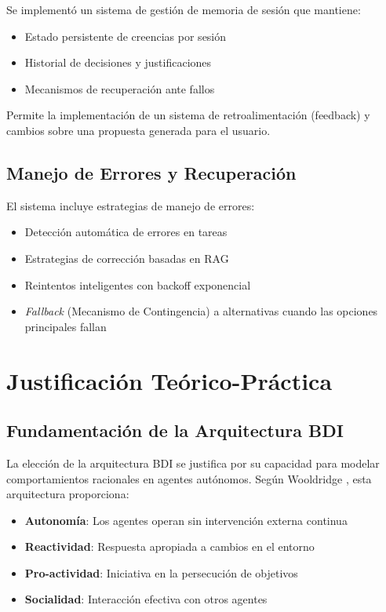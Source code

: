 \documentclass[runningheads,a4paper]{llncs}
\begin{document}
Se implementó un sistema de gestión de memoria de sesión que mantiene:

\begin{itemize}
    \item Estado persistente de creencias por sesión
    \item Historial de decisiones y justificaciones
    \item Mecanismos de recuperación ante fallos
\end{itemize}

Permite la implementación de un sistema de retroalimentación (feedback) y cambios sobre una propuesta generada para el usuario.

\subsection{Manejo de Errores y Recuperación}

El sistema incluye estrategias de manejo de errores:

\begin{itemize}
    \item Detección automática de errores en tareas
    \item Estrategias de corrección basadas en RAG
    \item Reintentos inteligentes con backoff exponencial
    \item \textit{Fallback} (Mecanismo de Contingencia) a alternativas cuando las opciones principales fallan
\end{itemize}

\section{Justificación Teórico-Práctica}

\subsection{Fundamentación de la Arquitectura BDI}

La elección de la arquitectura BDI se justifica por su capacidad para modelar comportamientos racionales en agentes autónomos. Según Wooldridge \cite{wooldridge2009introduction}, esta arquitectura proporciona:

\begin{itemize}
    \item \textbf{Autonomía}: Los agentes operan sin intervención externa continua
    \item \textbf{Reactividad}: Respuesta apropiada a cambios en el entorno
    \item \textbf{Pro-actividad}: Iniciativa en la persecución de objetivos
    \item \textbf{Socialidad}: Interacción efectiva con otros agentes
\end{itemize}
\end{document}
